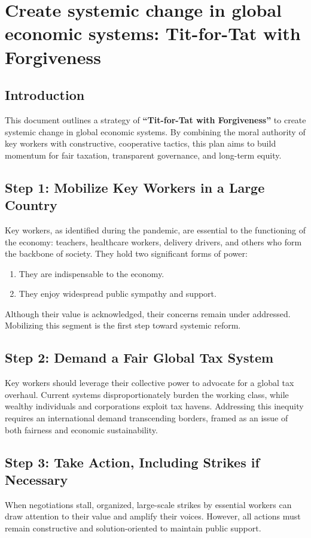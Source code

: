 \chapter{Create systemic change in global economic systems: Tit-for-Tat with Forgiveness }

\section{Introduction}
This document outlines a strategy of \textbf{``Tit-for-Tat with Forgiveness''} to create systemic change in global economic systems. By combining the moral authority of key workers with constructive, cooperative tactics, this plan aims to build momentum for fair taxation, transparent governance, and long-term equity.

\section{Step 1: Mobilize Key Workers in a Large Country}
Key workers, as identified during the pandemic, are essential to the functioning of the economy: teachers, healthcare workers, delivery drivers, and others who form the backbone of society. They hold two significant forms of power:
\begin{enumerate}
  \item They are indispensable to the economy.
  \item They enjoy widespread public sympathy and support.
\end{enumerate}
Although their value is acknowledged, their concerns remain under addressed. Mobilizing this segment is the first step toward systemic reform.

\section{Step 2: Demand a Fair Global Tax System}
Key workers should leverage their collective power to advocate for a global tax overhaul. Current systems disproportionately burden the working class, while wealthy individuals and corporations exploit tax havens. Addressing this inequity requires an international demand transcending borders, framed as an issue of both fairness and economic sustainability.

\section{Step 3: Take Action, Including Strikes if Necessary}
When negotiations stall, organized, large-scale strikes by essential workers can draw attention to their value and amplify their voices. However, all actions must remain constructive and solution-oriented to maintain public support.

